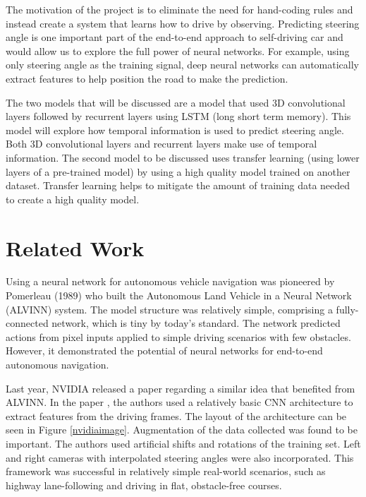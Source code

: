 \documentclass[10pt,twocolumn,letterpaper]{article}
\begin{document}
The motivation of the project is to eliminate the need for hand-coding rules and instead create a system that learns how to drive by observing. Predicting steering angle is one important part of the end-to-end approach to self-driving car and would allow us to explore the full power of neural networks. For example, using only steering angle as the training signal, deep neural networks can automatically extract features to help position the road to make the prediction.

The two models that will be discussed are a model that used 3D convolutional layers followed by recurrent layers using LSTM (long short term memory). This model will explore how temporal information is used to predict steering angle. Both 3D convolutional layers and recurrent layers make use of temporal information. The second model to be discussed uses transfer learning (using lower layers of a pre-trained model) by using a high quality model trained on another dataset. Transfer learning helps to mitigate the amount of training data needed to create a high quality model.


\section{Related Work}

Using a neural network for autonomous vehicle navigation was pioneered by Pomerleau (1989) \cite{pomerleau1989alvinn} who built the Autonomous Land Vehicle in a Neural Network (ALVINN) system. The model structure was relatively simple, comprising a fully-connected network, which is tiny by today’s standard. The network predicted actions from pixel inputs applied to simple driving scenarios with few obstacles. However, it demonstrated the potential of neural networks for end-to-end autonomous navigation. 

Last year, NVIDIA released a paper regarding a similar idea that benefited from ALVINN.  In the paper \cite{bojarski2016end}, the authors used a relatively basic CNN architecture to extract features from the driving frames. The layout of the architecture can be seen in Figure \ref{nvidiaimage}. Augmentation of the data collected was found to be important. The authors used artificial shifts and rotations of the training set. Left and right cameras with interpolated steering angles were also incorporated. This framework was successful in relatively simple real-world scenarios, such as highway lane-following and driving in flat, obstacle-free courses.  
\end{document}
